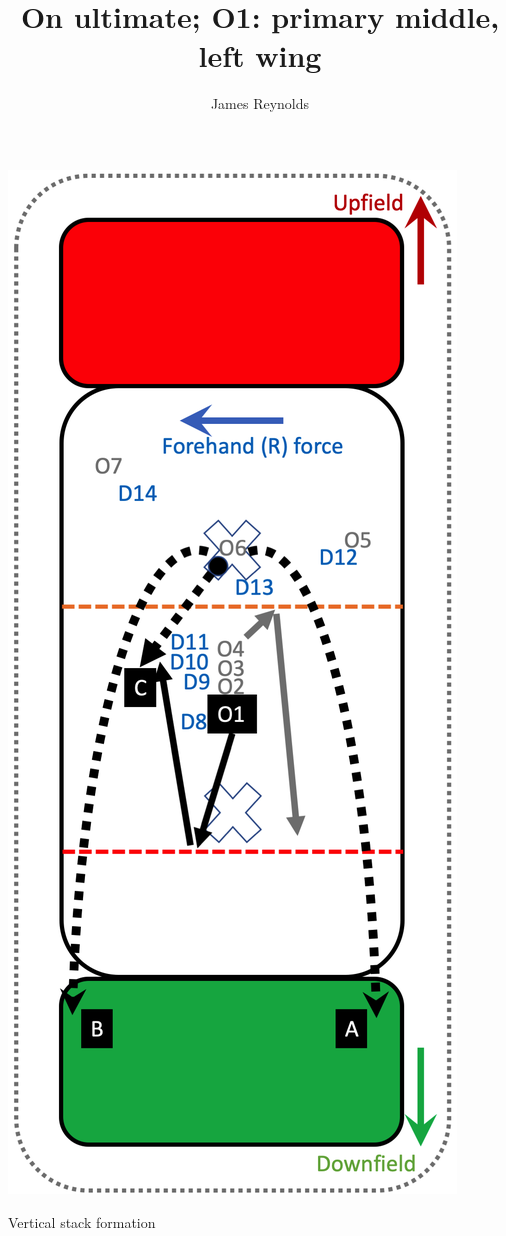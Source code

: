 \documentclass{tufte-handout}
\title{On ultimate; O1: primary middle, left wing}
\author[James Reynolds]{James Reynolds}
\begin{document}
\maketitle%


\begin{marginfigure}%
  \includegraphics[width=\linewidth]{O1-vertical}
  \caption{Vertical stack formation}
  \label{fig:O1-vertical}
\end{marginfigure}
\end{document}
